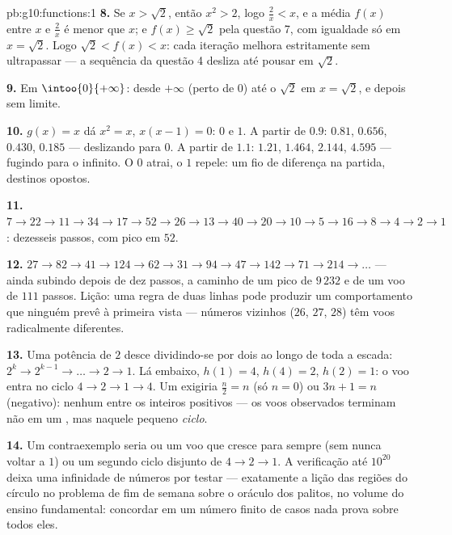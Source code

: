 \begin{solution}{pb:g10:functions:1}
\textbf{8.} Se $x > \sqrt2$, então $x^2 > 2$, logo
$\frac2x < x$, e a média $f(x)$ entre $x$ e $\frac2x$ é menor
que $x$; e $f(x) \geq \sqrt2$ pela questão 7, com igualdade só
em $x = \sqrt2$. Logo $\sqrt2 < f(x) < x$: cada iteração
melhora estritamente sem ultrapassar --- a sequência da questão
4 desliza até pousar em $\sqrt2$.

\textbf{9.} Em $\intoo{0}{+\infty}$:  desde
$+\infty$ (perto de $0$) até o  $\sqrt2$ em
$x = \sqrt2$, e depois  sem limite.

\textbf{10.} $g(x) = x$ dá $x^2 = x$, $x(x - 1) = 0$:  $0$ e $1$. A partir de $0.9$: $0.81$, $0.656$, $0.430$,
$0.185$ --- deslizando para $0$. A partir de $1.1$: $1.21$,
$1.464$, $2.144$, $4.595$ --- fugindo para o infinito. O  $0$ atrai, o $1$ repele: um fio de diferença na partida,
destinos opostos.

\textbf{11.} $7 \to 22 \to 11 \to 34 \to 17 \to 52 \to 26 \to
13 \to 40 \to 20 \to 10 \to 5 \to 16 \to 8 \to 4 \to 2 \to 1$:
dezesseis passos, com pico em $52$.

\textbf{12.} $27 \to 82 \to 41 \to 124 \to 62 \to 31 \to 94 \to
47 \to 142 \to 71 \to 214 \to \dots$ --- ainda subindo depois de
dez passos, a caminho de um pico de $9\,232$ e de um voo de
$111$ passos. Lição: uma regra de duas linhas pode produzir um
comportamento que ninguém prevê à primeira vista --- números
vizinhos ($26$, $27$, $28$) têm voos radicalmente diferentes.

\textbf{13.} Uma potência de $2$ desce dividindo-se por dois ao
longo de toda a escada: $2^k \to 2^{k-1} \to \dots \to 2 \to
1$. Lá embaixo, $h(1) = 4$, $h(4) = 2$, $h(2) = 1$: o voo entra
no ciclo $4 \to 2 \to 1 \to 4$. Um  exigiria
$\frac n2 = n$ (só $n = 0$) ou $3n + 1 = n$ (negativo): nenhum
entre os inteiros positivos --- os voos observados terminam não
em um , mas naquele pequeno \emph{ciclo}.

\textbf{14.} Um contraexemplo seria ou um voo que cresce para
sempre (sem nunca voltar a $1$) ou um segundo ciclo disjunto de
$4 \to 2 \to 1$. A verificação até $10^{20}$ deixa uma
infinidade de números por testar --- exatamente a lição das
regiões do círculo no problema de fim de semana sobre o oráculo
dos palitos, no volume do ensino fundamental: concordar em um
número finito de casos nada prova sobre todos eles.


\end{solution}

